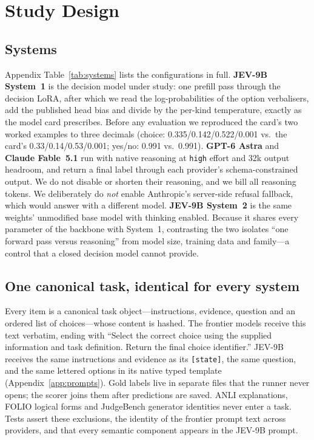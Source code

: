 \section{Study Design}
\label{sec:design}

\subsection{Systems}
\label{sec:systems}
Appendix Table~\ref{tab:systems} lists the configurations in full.
\textbf{JEV-9B System~1} is the decision model under study: one prefill pass through the decision LoRA, after which we read the log-probabilities of the option verbalisers, add the published head bias and divide by the per-kind temperature, exactly as the model card prescribes.
Before any evaluation we reproduced the card's two worked examples to three decimals (choice: 0.335/0.142/0.522/0.001 vs.\ the card's 0.33/0.14/0.53/0.001; yes/no: 0.991 vs.\ 0.991).
\textbf{GPT-6 Astra} and \textbf{Claude Fable~5.1} run with native reasoning at \texttt{high} effort and 32k output headroom, and return a final label through each provider's schema-constrained output.
We do not disable or shorten their reasoning, and we bill all reasoning tokens.
We deliberately do \emph{not} enable Anthropic's server-side refusal fallback, which would answer with a different model.
\textbf{JEV-9B System~2} is the same weights' unmodified base model with thinking enabled.
Because it shares every parameter of the backbone with System~1, contrasting the two isolates ``one forward pass versus reasoning'' from model size, training data and family---a control that a closed decision model cannot provide.



\subsection{One canonical task, identical for every system}
\label{sec:canonical}
Every item is a canonical task object---instructions, evidence, question and an ordered list of choices---whose content is hashed.
The frontier models receive this text verbatim, ending with ``Select the correct choice using the supplied information and task definition. Return the final choice identifier.''
JEV-9B receives the same instructions and evidence as its \texttt{[state]}, the same question, and the same lettered options in its native typed template (Appendix~\ref{app:prompts}).
Gold labels live in separate files that the runner never opens; the scorer joins them after predictions are saved.
ANLI explanations, FOLIO logical forms and JudgeBench generator identities never enter a task.
Tests assert these exclusions, the identity of the frontier prompt text across providers, and that every semantic component appears in the JEV-9B prompt.

